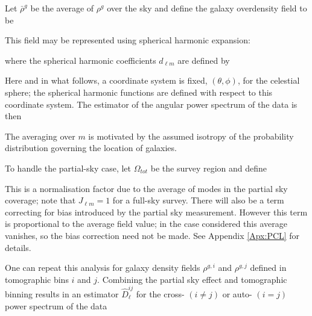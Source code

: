 \qquad Let $\bar{\rho}^g$ be the average of $\rho^g$ over the sky and define the galaxy overdensity field to be  


\noindent This field may be represented using spherical harmonic expansion:


\noindent where the spherical harmonic coefficients $d_{\ell m}$ are defined by


\noindent Here and in what follows, a coordinate system is fixed, $(\theta, \phi)$, for the celestial sphere; the spherical harmonic functions are defined with respect to this coordinate system. The estimator of the angular power spectrum of the data is then


\noindent The averaging over $m$ is motivated by the assumed isotropy of the probability distribution governing the location of galaxies.

\qquad To handle the partial-sky case, let $\Omega_{tot}$ be the survey region and define


\noindent This is a normalisation factor due to the average of modes in the partial sky coverage; note that $J_{\ell m}=1$ for a full-sky survey. There will also be a term correcting for bias introduced by the partial sky measurement. However this term is proportional to the average field value; in the case considered this average vanishes, so the bias correction need not be made. See Appendix \ref{Apx:PCL} for details. 

\qquad One can repeat this analysis for galaxy density fields $\rho^{g, i}$ and $\rho^{g, j}$ defined in tomographic bins $i$ and $j$. Combining the partial sky effect and tomographic binning results in an estimator $\hat{D}_{\ell}^{i j}$ for the cross- $(i \neq j)$ or auto- $(i = j)$ power spectrum of the data


